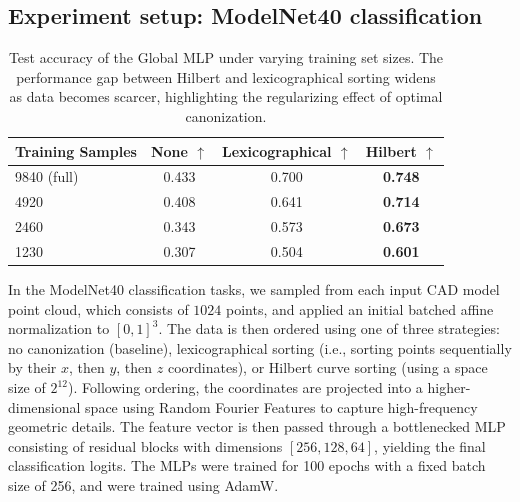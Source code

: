 \documentclass{article}
\theoremstyle{definition}
\theoremstyle{plain}
\begin{document}
\subsection{Experiment setup: ModelNet40 classification}
\begin{table}[ht]
\centering
\caption{Test accuracy of the Global MLP under varying training set sizes. The performance gap between Hilbert and lexicographical sorting widens as data becomes scarcer, highlighting the regularizing effect of optimal canonization.}
\label{tab:data_scarcity}
\begin{tabular}{lccc}
\toprule
\textbf{Training Samples} & \textbf{None} $\uparrow$ & \textbf{Lexicographical} $\uparrow$ & \textbf{Hilbert} $\uparrow$ \\
\midrule
9840 (full) & 0.433 & 0.700 & \textbf{0.748} \\
4920 & 0.408 & 0.641 & \textbf{0.714} \\
2460 & 0.343 & 0.573 & \textbf{0.673} \\
1230 & 0.307 & 0.504 & \textbf{0.601} \\
\bottomrule
\end{tabular}
\end{table}
In the ModelNet40 classification tasks, we sampled from each input CAD model point cloud, which consists of $1024$ points, and applied an initial batched affine normalization to $[0, 1]^3$. The data is then ordered using one of three strategies: no canonization (baseline), lexicographical sorting (i.e., sorting points sequentially by their $x$, then $y$, then $z$ coordinates), or Hilbert curve sorting (using a space size of $2^{12}$). Following ordering, the coordinates are projected into a higher-dimensional space using Random Fourier Features to capture high-frequency geometric details. The feature vector is then passed through a bottlenecked MLP consisting of residual blocks with dimensions $[256, 128, 64]$, yielding the final classification logits. The MLPs were trained for 100 epochs with a fixed batch size of 256, and were trained using AdamW.
\end{document}
